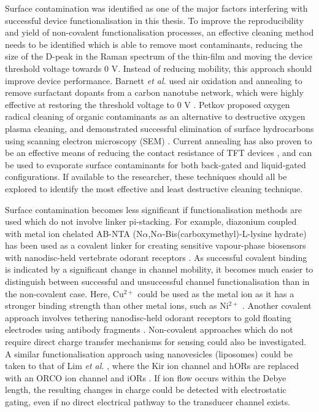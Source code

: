 \documentclass[
  a4paper,
]{scrbook}
\begin{document}
Surface contamination was identified as one of the major factors
interfering with successful device functionalisation in this thesis. To
improve the reproducibility and yield of non-covalent functionalisation
processes, an effective cleaning method needs to be identified which is
able to remove most contaminants, reducing the size of the D-peak in the
Raman spectrum of the thin-film and moving the device threshold voltage
towards 0 V. Instead of reducing mobility, this approach should improve
device performance. Barnett \emph{et al.} used air oxidation and
annealing to remove surfactant dopants from a carbon nanotube network,
which were highly effective at restoring the threshold voltage to 0 V
\autocite{Barnett2018}. Petkov proposed oxygen radical cleaning of
organic contaminants as an alternative to destructive oxygen plasma
cleaning, and demonstrated successful elimination of surface
hydrocarbons using scanning electron microscopy (SEM)
\autocite{Petkov2005}. Current annealing has also proven to be an
effective means of reducing the contact resistance of TFT devices
\autocite{Schnitzspan2020}, and can be used to evaporate surface
contaminants for both back-gated \autocite{Ramamoorthy2018} and
liquid-gated \autocite{Kireev2017} configurations. If available to the
researcher, these techniques should all be explored to identify the most
effective and least destructive cleaning technique.

Surface contamination becomes less significant if functionalisation
methods are used which do not involve linker pi-stacking. For example,
diazonium coupled with metal ion chelated AB-NTA
(N\(\alpha\),N\(\alpha\)-Bis(carboxymethyl)-L-lysine hydrate) has been
used as a covalent linker for creating sensitive vapour-phase biosensors
with nanodisc-held vertebrate odorant receptors
\autocite{Goldsmith2011}. As successful covalent binding is indicated by
a significant change in channel mobility, it becomes much easier to
distinguish between successful and unsuccessful channel
functionalisation than in the non-covalent case. Here, Cu\(^{2+}\) could
be used as the metal ion as it has a stronger binding strength than
other metal ions, such as Ni\(^{2+}\)
\autocite{Chang2017,Aravinda2009,Baur2010}. Another covalent approach
involves tethering nanodisc-held odorant receptors to gold floating
electrodes using antibody fragments
\autocite{Yang2017,Yang2018,Lee2018}. Non-covalent approaches which do
not require direct charge transfer mechanisms for sensing could also be
investigated. A similar functionalisation approach using nanovesicles
(liposomes) could be taken to that of Lim \emph{et al.}
\autocite{Lim2015}, where the Kir ion channel and hORs are replaced with
an ORCO ion channel and iORs \autocite{Wicher2021}. If ion flow occurs
within the Debye length, the resulting changes in charge could be
detected with electrostatic gating, even if no direct electrical pathway
to the transducer channel exists.
\end{document}
